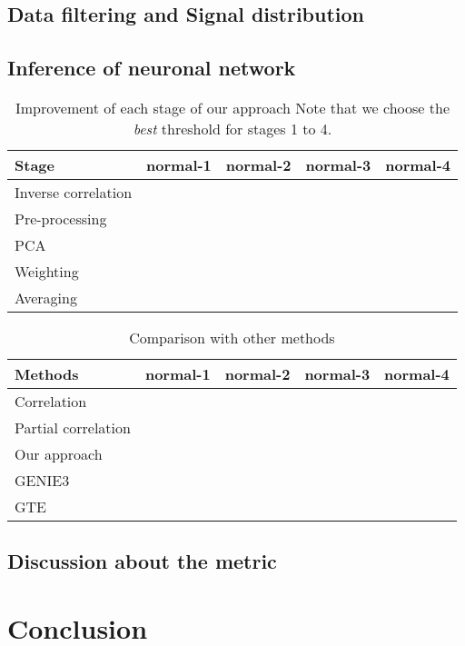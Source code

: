 \documentclass[wcp]{jmlr}
\begin{document}
\subsection{Data filtering and Signal distribution}

\subsection{Inference of neuronal network}


\begin{table}[htb]
\centering
\caption{Improvement of each stage of our approach Note that we choose the
         \textit{best} threshold for stages 1 to 4.}
\begin{tabular}{*{5}{l}}
\toprule
Stage               & normal-1 & normal-2 & normal-3 & normal-4 \\
\midrule
Inverse correlation & & & & \\
Pre-processing      & & & & \\
PCA                 & & & & \\
Weighting           & & & & \\
Averaging           & & & & \\
\bottomrule
\end{tabular}
\end{table}


\begin{table}[htb]
\centering
\caption{Comparison with other methods}
\begin{tabular}{*{5}{l}}
\toprule
Methods             & normal-1 & normal-2 & normal-3 & normal-4 \\
\midrule
Correlation         & & & & \\
Partial correlation & & & & \\
Our approach        & & & & \\
GENIE3              & & & & \\
GTE                 & & & & \\
\bottomrule
\end{tabular}
\end{table}


\subsection{Discussion about the metric}
\label{sec:metric}


\section{Conclusion}
\end{document}
